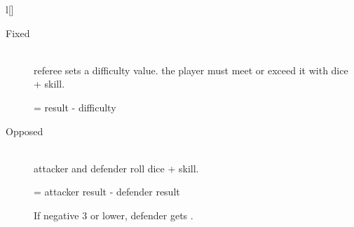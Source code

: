 \begin{wrapfigure}[14]{l}[\sidebarwidth]{\halfbarwidth}
\colorbox{sbbackground}{\begin{minipage}{\halfbarinnerwidth}%
\begin{description}
\item[Fixed]~\\
referee sets a difficulty value. the player must meet or exceed it with dice + skill.

 = result - difficulty

\item[Opposed]~\\
attacker and defender roll dice + skill.

 = attacker result - defender result

If negative 3 or lower, defender gets .

\end{description}
\end{minipage}}%
\end{wrapfigure}%
